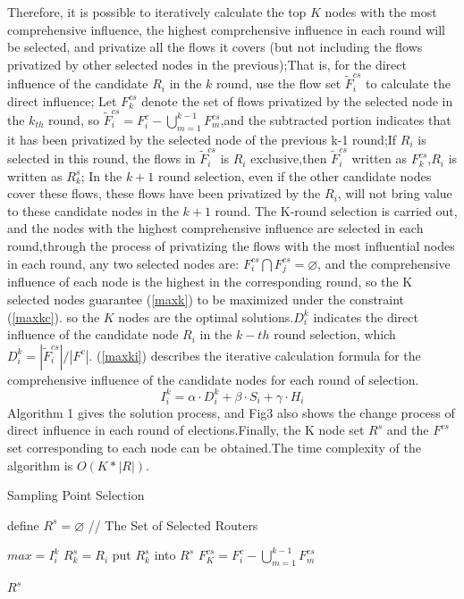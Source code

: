 \documentclass[conference]{IEEEtran}
\begin{document}
Therefore, it is possible to iteratively calculate the top $K$ nodes with the most comprehensive influence, the highest comprehensive influence in each round will be selected, and privatize all the flows it covers (but not including the flows privatized by other selected nodes in the previous);That is, for the direct influence of the candidate $R_i$ in the $k$ round, use the flow set $\widetilde{F}^{cs}_i$ to calculate the direct influence; Let $F_k^{cs}$ denote the set of flows privatized by the selected node in the $k_{th}$ round, so $\widetilde{F}^{cs}_i = F_i^c- \bigcup_{m=1}^{k-1}F_m^{cs}$,and the subtracted portion indicates that it has been privatized by the selected node of the previous k-1 round;If $R_i$ is selected in this round, the flows in $\widetilde{F}^{cs}_i$ is $R_i$ exclusive,then $\widetilde{F}^{cs}_i$ written as $F^{cs}_k$,$R_i$ is written as $R^s_k$; In the $k+1$ round selection, even if the other candidate nodes cover these flows, these flows have been privatized by the $R_i$, will not bring value to these candidate nodes in the $k+1$ round. The K-round selection is carried out, and the nodes with the highest comprehensive influence are selected in each round,through the process of privatizing the flows with the most influential nodes in each round, any two selected nodes are: $F^{cs}_i \bigcap F^{cs}_j = \varnothing$, and the comprehensive influence of each node is the highest in the corresponding round, so the K selected nodes guarantee (\ref{maxk}) to be maximized under the constraint (\ref{maxkc}). so the $K$ nodes are the optimal solutions.$D_i^k$ indicates the direct influence of the candidate node $R_i$ in the $k-th$ round selection, which $D_i^k = |\widetilde{F}^{cs}_i|/{\left| F^c \right|}$. (\ref{maxki}) describes the iterative calculation formula for the comprehensive influence of the candidate nodes for each round of selection.
\begin{equation}
I_{i}^{k}=\alpha \cdot D_{i}^{k}+\beta \cdot {{S}_{i}}+\gamma \cdot {{H}_{i}}
\label{maxki}
\end{equation}
Algorithm 1 gives the solution process, and Fig3 also shows the change process of direct influence in each round of elections.Finally, the K node set $R^s$ and the $F^{cs}$ set corresponding to each node can be obtained.The time complexity of the algorithm is $O(K*|R|)$.


\begin{algorithm}[h]
\caption{Sampling Point Selection}
\begin{algorithmic}[1]

\STATE define $R^s=\varnothing$  //  The Set of Selected Routers


\STATE $max = I_i^k$
\STATE $R^s_k = R_i$
\ENDIF
\ENDFOR
\STATE put $R^s_k$ into $R^s$
\STATE $F_K^{cs} = F_i^c- \bigcup_{m=1}^{k-1}F_m^{cs}$ 
\ENDFOR

\RETURN $R^s$
\label{code:recentEnd}
\end{algorithmic}
\end{algorithm}
\end{document}
